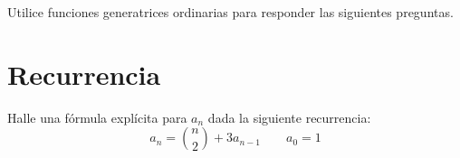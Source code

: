 \documentclass[spanish, fleqn]{article}
\title{Estructuras Discretas \\
	Tarea \#\num \\
	``Cómo aprender a generar en una tarde''}
\author{Sonny Muñoz Galaz}
\date{(201673003-6)}
\begin{document}
	\maketitle
	\thispagestyle{empty}
	
    Utilice funciones generatrices ordinarias para responder las siguientes preguntas.
    
	\section{Recurrencia}
	Halle una fórmula explícita para \(a_n\) dada la siguiente recurrencia:
    \begin{equation*}
    a_{n} = {n \choose 2} + 3a_{n-1} \qquad a_{0}=1
    \end{equation*}

	
\end{document}
